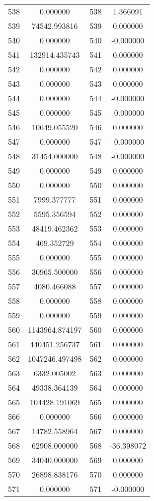 \documentclass[12pt]{article}
\begin{document}
\begin{longtable}{@{}cccc@{}}
538 & 0.000000 & 538 & 1.366091 \\
539 & 74542.993816 & 539 & 0.000000 \\
540 & 0.000000 & 540 & -0.000000 \\
541 & 132914.435743 & 541 & 0.000000 \\
542 & 0.000000 & 542 & 0.000000 \\
543 & 0.000000 & 543 & 0.000000 \\
544 & 0.000000 & 544 & -0.000000 \\
545 & 0.000000 & 545 & -0.000000 \\
546 & 10649.055520 & 546 & 0.000000 \\
547 & 0.000000 & 547 & -0.000000 \\
548 & 31454.000000 & 548 & -0.000000 \\
549 & 0.000000 & 549 & 0.000000 \\
550 & 0.000000 & 550 & 0.000000 \\
551 & 7999.377777 & 551 & 0.000000 \\
552 & 5595.356594 & 552 & 0.000000 \\
553 & 48419.462362 & 553 & 0.000000 \\
554 & 469.352729 & 554 & 0.000000 \\
555 & 0.000000 & 555 & 0.000000 \\
556 & 30965.500000 & 556 & 0.000000 \\
557 & 4080.466088 & 557 & 0.000000 \\
558 & 0.000000 & 558 & 0.000000 \\
559 & 0.000000 & 559 & 0.000000 \\
560 & 1143964.874197 & 560 & 0.000000 \\
561 & 440451.256737 & 561 & 0.000000 \\
562 & 1047246.497498 & 562 & 0.000000 \\
563 & 6332.005002 & 563 & 0.000000 \\
564 & 49338.364139 & 564 & 0.000000 \\
565 & 104428.191069 & 565 & 0.000000 \\
566 & 0.000000 & 566 & 0.000000 \\
567 & 14782.558964 & 567 & 0.000000 \\
568 & 62908.000000 & 568 & -36.398072 \\
569 & 34040.000000 & 569 & 0.000000 \\
570 & 26898.838176 & 570 & 0.000000 \\
571 & 0.000000 & 571 & -0.000000 \\

\end{longtable}
\end{document}
